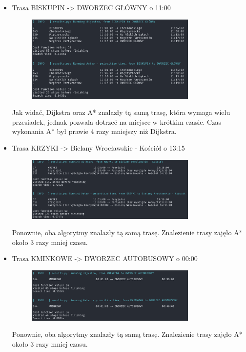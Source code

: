 \documentclass[a4paper, 12pt]{article}
\begin{document}
\begin{itemize}
  \item Trasa BISKUPIN -> DWORZEC GŁÓWNY o 11:00
  \begin{figure}[H]
    \centering
    \includegraphics[width=0.8\textwidth]{2024-04-07-12-54-53.png} 
  \end{figure}
  Jak widać, Dijkstra oraz A* znalazły tą samą trasę, która wymaga wielu 
  przesiadek, jednak pozwala dotrzeć na miejsce w krótkim czasie.
  Czas wykonania A* był prawie 4 razy mniejszy niż Dijkstra.
  
  \item Trasa KRZYKI -> Bielany Wrocławskie - Kościół o 13:15
  \begin{figure}[H]
    \centering
    \includegraphics[width=0.8\textwidth]{2024-04-07-12-58-54.png} 
  \end{figure}
  Ponownie, oba algorytmy znalazły tą samą trasę.
  Znalezienie trasy zajęło A* około 3 razy mniej czasu.
 
  \item Trasa KMINKOWE -> DWORZEC AUTOBUSOWY o 00:00
  \begin{figure}[H]
    \centering
    \includegraphics[width=0.8\textwidth]{2024-04-08-06-14-05.png} 
  \end{figure}
  Ponownie, oba algorytmy znalazły tą samą trasę.
  Znalezienie trasy zajęło A* około 3 razy mniej czasu.

\end{itemize}
\end{document}
